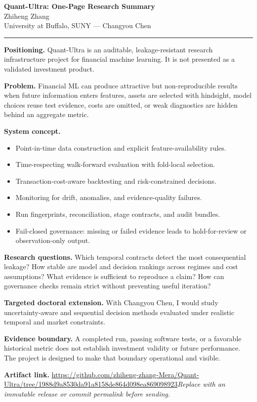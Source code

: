 \documentclass[11pt]{article}
\newcommand{\ApplicantName}{Zhiheng Zhang}
\newcommand{\ApplicantGitHub}{\url{https://github.com/zhiheng-zhang-Mera/Quant-Ultra/tree/1988d9a8530da91a8158de864d098ea869098923}}
\begin{document}
\begin{center}
{\LARGE\bfseries Quant-Ultra: One-Page Research Summary}\\[0.25em]
{\large \ApplicantName}\\
University at Buffalo, SUNY --- Changyou Chen
\end{center}
\vspace{0.35em}\hrule\vspace{0.65em}

\textbf{Positioning.} Quant-Ultra is an auditable, leakage-resistant research infrastructure project for financial machine learning. It is not presented as a validated investment product.

\textbf{Problem.} Financial ML can produce attractive but non-reproducible results when future information enters features, assets are selected with hindsight, model choices reuse test evidence, costs are omitted, or weak diagnostics are hidden behind an aggregate metric.

\textbf{System concept.}
\begin{itemize}
\item Point-in-time data construction and explicit feature-availability rules.
\item Time-respecting walk-forward evaluation with fold-local selection.
\item Transaction-cost-aware backtesting and risk-constrained decisions.
\item Monitoring for drift, anomalies, and evidence-quality failures.
\item Run fingerprints, reconciliation, stage contracts, and audit bundles.
\item Fail-closed governance: missing or failed evidence leads to hold-for-review or observation-only output.
\end{itemize}

\textbf{Research questions.} Which temporal contracts detect the most consequential leakage? How stable are model and decision rankings across regimes and cost assumptions? What evidence is sufficient to reproduce a claim? How can governance checks remain strict without preventing useful iteration?

\textbf{Targeted doctoral extension.} With Changyou Chen, I would study uncertainty-aware and sequential decision methods evaluated under realistic temporal and market constraints.

\textbf{Evidence boundary.} A completed run, passing software tests, or a favorable historical metric does not establish investment validity or future performance. The project is designed to make that boundary operational and visible.

\textbf{Artifact link.} \ApplicantGitHub\quad \textit{Replace with an immutable release or commit permalink before sending.}
\end{document}
